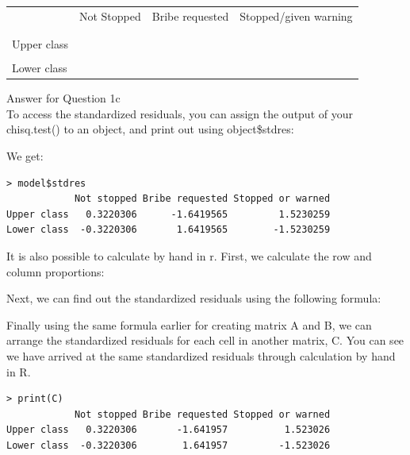\documentclass[12pt,letterpaper]{article}
\begin{document}
	\begin{table}[h]
		\centering
		\begin{tabular}{l | c c c }
			& Not Stopped & Bribe requested & Stopped/given warning \\
			\\[-1.8ex] 
			\hline \\[-1.8ex]
			Upper class  &  &  &  \\
			\\
			Lower class &  &   &   \\
			
		\end{tabular}
	\end{table}
			\item
Answer for Question 1c\\
\noindent To access the standardized residuals, you can assign the output of your chisq.test() to an object, and print out using object\$stdres:\\
\vspace{.5cm}
  
\vspace{.5cm}
\noindent We get:\\
\begin{verbatim}
> model$stdres
            Not stopped Bribe requested Stopped or warned
Upper class   0.3220306      -1.6419565         1.5230259
Lower class  -0.3220306       1.6419565        -1.5230259
\end{verbatim}
\noindent It is also possible to calculate by hand in r. First, we calculate the row and column proportions:\\
\vspace{.5cm}
  
\vspace{.5cm}
\noindent Next, we can find out the standardized residuals using the following formula:\\
\vspace{.5cm}
  
\vspace{.5cm}
\noindent Finally using the same formula earlier for creating matrix A and B, we can arrange the standardized residuals for each cell in another matrix, C. You can see we have arrived at the same standardized residuals through calculation by hand in R.\\
\begin{verbatim}
> print(C)
            Not stopped Bribe requested Stopped or warned
Upper class   0.3220306       -1.641957          1.523026
Lower class  -0.3220306        1.641957         -1.523026
\end{verbatim}
	
\end{document}
